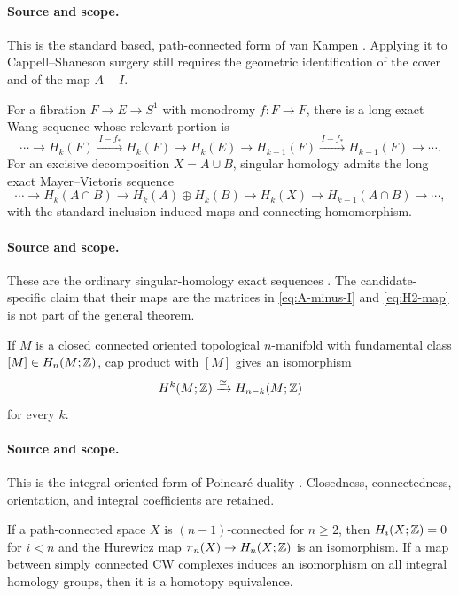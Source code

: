 \paragraph{Source and scope.}
This is the standard based, path-connected form of van Kampen
\cite[Section~1.2]{Hatcher2002}.  Applying it to Cappell--Shaneson surgery
still requires the geometric identification of the cover and of the map
$A-I$.

\begin{externalresult}\label{prop:wang-mv}
For a fibration $F\to E\to S^1$ with monodromy $f:F\to F$, there is a long
exact Wang sequence whose relevant portion is
\[
\cdots\to H_k(F)\xrightarrow{\,I-f_*\,}H_k(F)
\longrightarrow H_k(E)\longrightarrow
H_{k-1}(F)\xrightarrow{\,I-f_*\,}H_{k-1}(F)\to\cdots.
\]
For an excisive decomposition $X=A\cup B$, singular homology admits the long
exact Mayer--Vietoris sequence
\[
\cdots\to H_k(A\cap B)\to H_k(A)\oplus H_k(B)
\to H_k(X)\to H_{k-1}(A\cap B)\to\cdots,
\]
with the standard inclusion-induced maps and connecting homomorphism.
\end{externalresult}

\paragraph{Source and scope.}
These are the ordinary singular-homology exact sequences
\cite[Sections~2.2 and 4.2]{Hatcher2002}.  The candidate-specific claim that
their maps are the matrices in \eqref{eq:A-minus-I} and \eqref{eq:H2-map}
is not part of the general theorem.

\begin{externalresult}\label{prop:PD}
If $M$ is a closed connected oriented topological $n$-manifold with
fundamental class $[M]\in H_n(M;\mathbb{Z})$, cap product with $[M]$ gives an
isomorphism
\[
H^k(M;\mathbb{Z})\xrightarrow{\cong}H_{n-k}(M;\mathbb{Z})
\]
for every $k$.
\end{externalresult}

\paragraph{Source and scope.}
This is the integral oriented form of Poincar\'e duality
\cite[Section~3.3]{Hatcher2002}.  Closedness, connectedness, orientation, and
integral coefficients are retained.

\begin{externalresult}\label{prop:hurewicz-whitehead}
If a path-connected space $X$ is $(n-1)$-connected for $n\ge2$, then
$H_i(X;\mathbb{Z})=0$ for $i<n$ and the Hurewicz map
$\pi_n(X)\to H_n(X;\mathbb{Z})$ is an isomorphism.  If a map between simply connected
CW complexes induces an isomorphism on all integral homology groups, then it
is a homotopy equivalence.
\end{externalresult}

